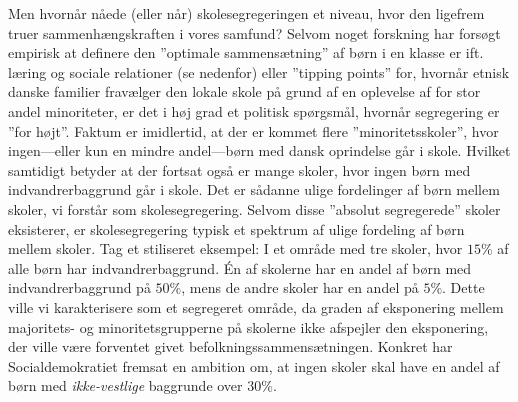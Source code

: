 \documentclass[
]{book}
\begin{document}
Men hvornår nåede (eller når) skolesegregeringen et niveau, hvor den ligefrem truer sammenhængskraften i vores samfund? Selvom noget forskning har forsøgt empirisk at definere den ''optimale sammensætning'' af børn i en klasse er ift. læring og sociale relationer (se nedenfor) eller ''tipping points'' for, hvornår etnisk danske familier fravælger den lokale skole på grund af en oplevelse af for stor andel minoriteter, er det i høj grad et politisk spørgsmål, hvornår segregering er ''for højt''. Faktum er imidlertid, at der er kommet flere ''minoritetsskoler'', hvor ingen---eller kun en mindre andel---børn med dansk oprindelse går i skole. Hvilket samtidigt betyder at der fortsat også er mange skoler, hvor ingen børn med indvandrerbaggrund går i skole. Det er sådanne ulige fordelinger af børn mellem skoler, vi forstår som skolesegregering. Selvom disse ''absolut segregerede'' skoler eksisterer, er skolesegregering typisk et spektrum af ulige fordeling af børn mellem skoler. Tag et stiliseret eksempel: I et område med tre skoler, hvor \(15\%\) af alle børn har indvandrerbaggrund. Én af skolerne har en andel af børn med indvandrerbaggrund på \(50\%\), mens de andre skoler har en andel på \(5\%\). Dette ville vi karakterisere som et segregeret område, da graden af eksponering mellem majoritets- og minoritetsgrupperne på skolerne ikke afspejler den eksponering, der ville være forventet givet befolkningssammensætningen. Konkret har Socialdemokratiet fremsat en ambition om, at ingen skoler skal have en andel af børn med \emph{ikke-vestlige} baggrunde over \(30\%\).
\end{document}
